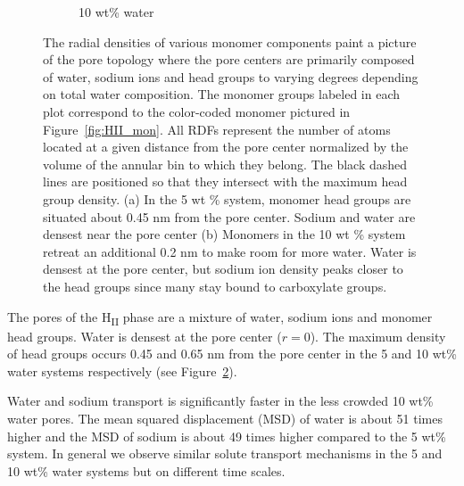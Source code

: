 \documentclass{article}
\begin{document}
\begin{figure}
\begin{subfigure}{0.49\linewidth}
  \caption{10 wt\% water}\label{fig:component_density_10wt}
  \end{subfigure}
  \caption{The radial densities of various monomer components paint a
  picture of the pore topology where the pore centers are primarily 
  composed of water, sodium ions and head groups to varying degrees
  depending on total water composition.
  The monomer groups labeled in each plot correspond to
  the color-coded monomer pictured in Figure~\ref{fig:HII_mon}. All RDFs
  represent the number of atoms located at a given distance from the pore center
  normalized by the volume of the annular bin to which they belong. The black
  dashed lines are positioned so that they intersect with the maximum head group
  density. (a) In the 5 wt \% system, monomer head groups are situated about 0.45 nm
  from the pore center. Sodium and water are densest near the pore center 
  (b) Monomers in the 10 wt \% system retreat an additional 0.2 nm to make room
  for more water. Water is densest at the pore center, but sodium ion density
  peaks closer to the head groups since many stay bound to carboxylate groups.}\label{fig:component_densities}
  \vspace{-0.5cm}
  \end{figure}
  
  The pores of the H\textsubscript{II} phase are a mixture of water, sodium
  ions and monomer head groups. Water is densest at the pore center ($r = 0$).
  The maximum density of head groups occurs 0.45 and 0.65 nm from the pore 
  center in the 5 and 10 wt\% water systems respectively (see 
  Figure~\ref{fig:component_densities}).
  
    
  Water and sodium transport is significantly faster in the less crowded 
  10 wt\% water pores. The mean squared displacement (MSD) of water is about
  51 times higher and the MSD of sodium is about 49 times higher compared to
  the 5 wt\% system. In general we observe similar solute transport mechanisms
  in the 5 and 10 wt\% water systems but on different time scales.
  
\end{document}

